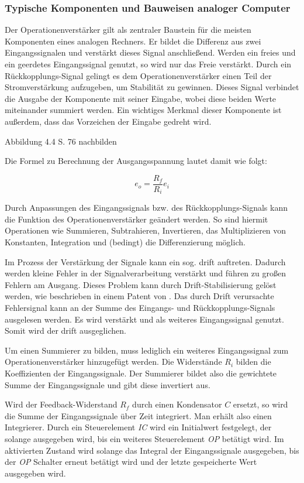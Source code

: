 \subsubsection{Typische Komponenten und Bauweisen analoger Computer}

Der Operationenverstärker gilt als zentraler Baustein für die meisten Komponenten eines analogen Rechners. Er bildet die Differenz aus zwei Eingangssignalen und verstärkt dieses Signal anschließend. Werden ein freies und ein geerdetes Eingangssignal genutzt, so wird nur das Freie verstärkt. Durch ein Rückkopplungs-Signal gelingt es dem Operationenverstärker einen Teil der Stromverstärkung aufzugeben, um Stabilität zu gewinnen. Dieses Signal verbindet die Ausgabe der Komponente mit seiner Eingabe, wobei diese beiden Werte miteinander summiert werden. Ein wichtiges Merkmal dieser Komponente ist außerdem, dass das Vorzeichen der Eingabe gedreht wird. \cite[vgl. S. 73 f.]{Ulmann2022}

Abbildung 4.4 S. 76 nachbilden

Die Formel zu Berechnung der Ausgangsspannung lautet damit wie folgt:

\[e_o=\frac{R_f}{R_i}e_i\]

Durch Anpassungen des Eingangssignals bzw. des Rückkopplungs-Signals kann die Funktion des Operationenverstärker geändert werden. So sind hiermit Operationen wie Summieren, Subtrahieren, Invertieren, das Multiplizieren von Konstanten, Integration und (bedingt) die Differenzierung möglich.

Im Prozess der Verstärkung der Signale kann ein sog. \gls{drift} auftreten. Dadurch werden kleine Fehler in der Signalverarbeitung verstärkt und führen zu großen Fehlern am Ausgang. Dieses Problem kann durch Drift-Stabilisierung gelöst werden, wie beschrieben in einem Patent von \cite{Goldberg1954}. Das durch Drift verursachte Fehlersignal kann an der Summe des Eingangs- und Rückkopplungs-Signals ausgelesen werden. Es wird verstärkt und als weiteres Eingangssignal genutzt. Somit wird der \gls{drift} ausgeglichen. \cite[vgl. S. 80]{Ulmann2022}

Um einen Summierer zu bilden, muss lediglich ein weiteres Eingangssignal zum Operationenverstärker hinzugefügt werden. Die Widerstände \(R_i\) bilden die Koeffizienten der Eingangssignale. Der Summierer bildet also die gewichtete Summe der Eingangssignale und gibt diese invertiert aus. \cite[vgl. S. 86]{Ulmann2022}

Wird der Feedback-Widerstand \(R_f\) durch einen Kondensator \(C\) ersetzt, so wird die Summe der Eingangssignale über Zeit integriert. Man erhält also einen Integrierer. Durch ein Steuerelement \textit{IC} wird ein Initialwert festgelegt, der solange ausgegeben wird, bis ein weiteres Steuerelement \textit{OP} betätigt wird. Im aktivierten Zustand wird solange das Integral der Eingangssignale ausgegeben, bis der \textit{OP} Schalter erneut betätigt wird und der letzte gespeicherte Wert ausgegeben wird. \cite[vgl. S. 89 ff.]{Ulmann2022}

